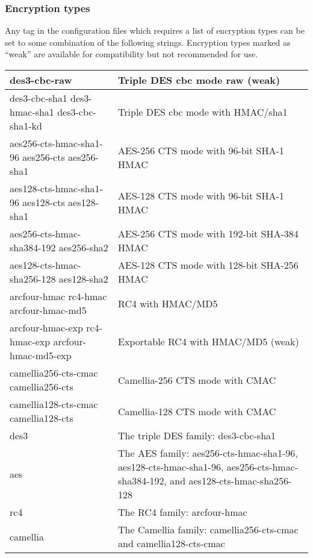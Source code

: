 \documentclass[letterpaper,10pt,english]{sphinxmanual}
\begin{document}
\subsubsection{Encryption types}
\label{\detokenize{admin/conf_files/kdc_conf:id6}}\label{\detokenize{admin/conf_files/kdc_conf:encryption-types}}
Any tag in the configuration files which requires a list of encryption
types can be set to some combination of the following strings.
Encryption types marked as “weak” are available for compatibility but
not recommended for use.


\begin{savenotes}\sphinxattablestart
\centering
\begin{tabulary}{\linewidth}[t]{|T|T|}
\hline

des3-cbc-raw
&
Triple DES cbc mode raw (weak)
\\
\hline
des3-cbc-sha1 des3-hmac-sha1 des3-cbc-sha1-kd
&
Triple DES cbc mode with HMAC/sha1
\\
\hline
aes256-cts-hmac-sha1-96 aes256-cts aes256-sha1
&
AES-256 CTS mode with 96-bit SHA-1 HMAC
\\
\hline
aes128-cts-hmac-sha1-96 aes128-cts aes128-sha1
&
AES-128 CTS mode with 96-bit SHA-1 HMAC
\\
\hline
aes256-cts-hmac-sha384-192 aes256-sha2
&
AES-256 CTS mode with 192-bit SHA-384 HMAC
\\
\hline
aes128-cts-hmac-sha256-128 aes128-sha2
&
AES-128 CTS mode with 128-bit SHA-256 HMAC
\\
\hline
arcfour-hmac rc4-hmac arcfour-hmac-md5
&
RC4 with HMAC/MD5
\\
\hline
arcfour-hmac-exp rc4-hmac-exp arcfour-hmac-md5-exp
&
Exportable RC4 with HMAC/MD5 (weak)
\\
\hline
camellia256-cts-cmac camellia256-cts
&
Camellia-256 CTS mode with CMAC
\\
\hline
camellia128-cts-cmac camellia128-cts
&
Camellia-128 CTS mode with CMAC
\\
\hline
des3
&
The triple DES family: des3-cbc-sha1
\\
\hline
aes
&
The AES family: aes256-cts-hmac-sha1-96, aes128-cts-hmac-sha1-96, aes256-cts-hmac-sha384-192, and aes128-cts-hmac-sha256-128
\\
\hline
rc4
&
The RC4 family: arcfour-hmac
\\
\hline
camellia
&
The Camellia family: camellia256-cts-cmac and camellia128-cts-cmac
\\
\hline
\end{tabulary}
\par
\sphinxattableend\end{savenotes}
\end{document}
